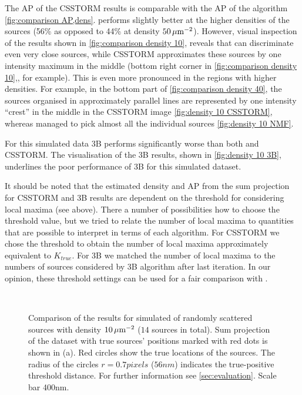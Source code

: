 The AP of the CSSTORM results is comparable with the AP of the \inmf{} algorithm \autoref{fig:comparison AP,dens}\bbb. \inmf{} performs slightly better at the higher densities of the sources (56\% as opposed to 44\% at density $50\, \mathrm{\mu m}^{-2}$). However, visual inspection of the results shown in \autoref{fig:comparison density 10}\bbb,\ccc{} reveals that \inmf{} can discriminate even very close sources, while CSSTORM approximates these sources by one intensity maximum in the middle (bottom right corner in \autoref{fig:comparison density 10}\bbb,\ccc, for example). This is even more pronounced in the regions with higher densities. For example, in the bottom part of \autoref{fig:comparison density 40}\bbb,\ccc{} the sources organised in approximately parallel lines are represented by one intensity ``crest'' in the middle in the CSSTORM image \autoref{fig:density 10 CSSTORM}, whereas \inmf{} managed to pick almost all the individual sources \autoref{fig:density 10 NMF}. 

For this simulated data 3B performs significantly worse than both \inmf{} and CSSTORM. The visualisation of the 3B results, shown in \autoref{fig:density 10 3B}, underlines the poor performance of 3B for this simulated dataset.

It should be noted that the estimated density and AP from the sum projection for CSSTORM and 3B results are dependent on the threshold for considering local maxima (see above). There a number of possibilities how to choose the threshold value, but we tried to relate the number of local maxima to quantities that are possible to interpret in terms of each algorithm. For CSSTORM we chose the threshold to obtain the number of local maxima approximately equivalent to $K_{true}$. For 3B we matched the number of local maxima to the numbers of sources considered by 3B algorithm after last iteration. In our opinion, these threshold settings can be used for a fair comparison with \inmf{}.
%
\begin{figure}[!p]
	\centering
	\newcommand{\sizef}{.95}
	\\
	\caption{Comparison of the results for simulated of randomly scattered sources with density $10\, \mathrm{\mu m}^{-2}$ ($14$ sources in total). Sum projection of the dataset with true sources' positions marked with red dots is shown in (a). Red circles show the true locations of the sources. The radius of the circles $r=0.7\unit{pixels}$ ($56\unit{nm}$) indicates the true-positive threshold distance. For further information see \autoref{sec:evaluation}. Scale bar 400\unit{nm}.}
	\label{fig:comparison density 10}
\end{figure}

